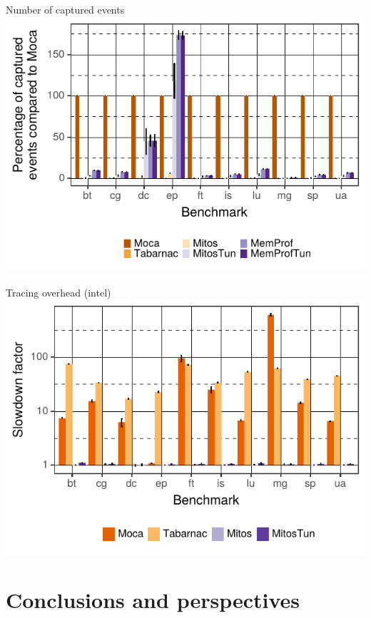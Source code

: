 \documentclass[xcolor={usenames,dvipsnames},hyperref={pdfusetitle}]{beamer}
\begin{document}
\begin{frame}{Number of captured events}
        \includegraphics[width=\linewidth]{moca/slides/moca_addr_intel.pdf}
\end{frame}

\begin{frame}{Tracing overhead (intel)}
        \includegraphics[width=\linewidth]{moca/slides/moca_overhead_intel.pdf}
\end{frame}

\section{Conclusions and perspectives}
\end{document}
